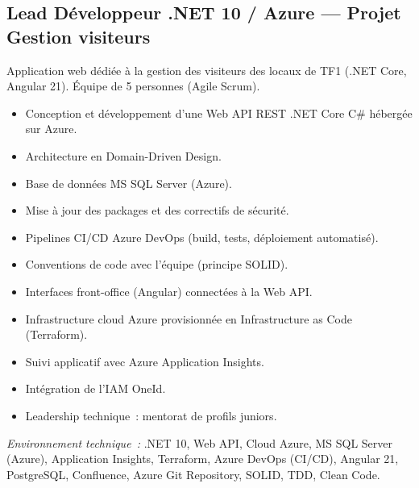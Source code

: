 \documentclass[10pt,a4paper]{article}
\begin{document}
\subsection*{Lead Développeur .NET 10 / Azure --- Projet Gestion visiteurs}
\color{darkgray}
Application web dédiée à la gestion des visiteurs des locaux de TF1 (.NET Core, Angular 21). Équipe de 5 personnes (Agile Scrum).
\begin{itemize}
  \item Conception et développement d'une Web API REST .NET Core C\# hébergée sur Azure.
  \item Architecture en Domain-Driven Design.
  \item Base de données MS SQL Server (Azure).
  \item Mise à jour des packages et des correctifs de sécurité.
  \item Pipelines CI/CD Azure DevOps (build, tests, déploiement automatisé).
  \item Conventions de code avec l'équipe (principe SOLID).
  \item Interfaces front-office (Angular) connectées à la Web API.
  \item Infrastructure cloud Azure provisionnée en Infrastructure as Code (Terraform).
  \item Suivi applicatif avec Azure Application Insights.
  \item Intégration de l'IAM OneId.
  \item Leadership technique~: mentorat de profils juniors.
\end{itemize}
\textit{Environnement technique~:} .NET 10, Web API, Cloud Azure, MS SQL Server (Azure), Application Insights, Terraform, Azure DevOps (CI/CD), Angular 21, PostgreSQL, Confluence, Azure Git Repository, SOLID, TDD, Clean Code.

\vspace{6pt}
\end{document}
